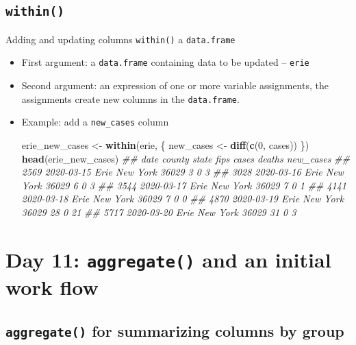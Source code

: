 \documentclass[]{book}
\newenvironment{Shaded}{\begin{snugshade}}{\end{snugshade}}
\newcommand{\CommentTok}[1]{\textcolor[rgb]{0.56,0.35,0.01}{\textit{#1}}}
\newcommand{\DecValTok}[1]{\textcolor[rgb]{0.00,0.00,0.81}{#1}}
\newcommand{\KeywordTok}[1]{\textcolor[rgb]{0.13,0.29,0.53}{\textbf{#1}}}
\newcommand{\NormalTok}[1]{#1}
\newcommand{\StringTok}[1]{\textcolor[rgb]{0.31,0.60,0.02}{#1}}
\begin{document}
\hypertarget{within}{%
\subsection*{\texorpdfstring{\texttt{within()}}{within()}}\label{within}}

Adding and updating columns \texttt{within()} a \texttt{data.frame}

\begin{itemize}
\item
  First argument: a \texttt{data.frame} containing data to be updated -- \texttt{erie}
\item
  Second argument: an expression of one or more variable assignments, the assignments create new columns in the \texttt{data.frame}.
\item
  Example: add a \texttt{new\_cases} column

\begin{Shaded}
\begin{Highlighting}[]
\NormalTok{erie_new_cases <-}\StringTok{ }\KeywordTok{within}\NormalTok{(erie, \{}
\NormalTok{    new_cases <-}\StringTok{ }\KeywordTok{diff}\NormalTok{(}\KeywordTok{c}\NormalTok{(}\DecValTok{0}\NormalTok{, cases))}
\NormalTok{\})}
\KeywordTok{head}\NormalTok{(erie_new_cases)}
\CommentTok{##            date county    state  fips cases deaths new_cases}
\CommentTok{## 2569 2020-03-15   Erie New York 36029     3      0         3}
\CommentTok{## 3028 2020-03-16   Erie New York 36029     6      0         3}
\CommentTok{## 3544 2020-03-17   Erie New York 36029     7      0         1}
\CommentTok{## 4141 2020-03-18   Erie New York 36029     7      0         0}
\CommentTok{## 4870 2020-03-19   Erie New York 36029    28      0        21}
\CommentTok{## 5717 2020-03-20   Erie New York 36029    31      0         3}
\end{Highlighting}
\end{Shaded}
\end{itemize}

\hypertarget{day-11-aggregate-and-an-initial-work-flow}{%
\section{\texorpdfstring{Day 11: \texttt{aggregate()} and an initial work flow}{Day 11: aggregate() and an initial work flow}}\label{day-11-aggregate-and-an-initial-work-flow}}

\hypertarget{aggregate-for-summarizing-columns-by-group}{%
\subsection*{\texorpdfstring{\texttt{aggregate()} for summarizing columns by group}{aggregate() for summarizing columns by group}}\label{aggregate-for-summarizing-columns-by-group}}
\end{document}
